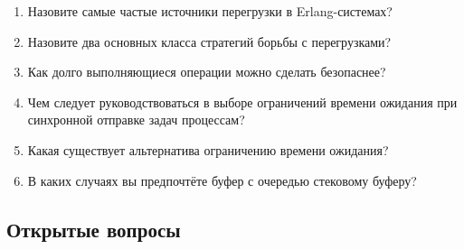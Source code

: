 \documentclass[11pt, oneside]{book}   	%
\newcommand{\OpenEndedTitle}{Открытые вопросы}
\begin{document}
\begin{enumerate}
	\item Назовите самые частые источники перегрузки в Erlang-системах?
	\item Назовите два основных класса стратегий борьбы с перегрузками?
	\item Как долго выполняющиеся операции можно сделать безопаснее?
	\item Чем следует руководствоваться в выборе ограничений времени ожидания при синхронной отправке задач процессам?
	\item Какая существует альтернатива ограничению времени ожидания?
	\item В каких случаях вы предпочтёте буфер с очередью стековому буферу?
\end{enumerate}

\subsection*{\OpenEndedTitle{}}
\end{document}
